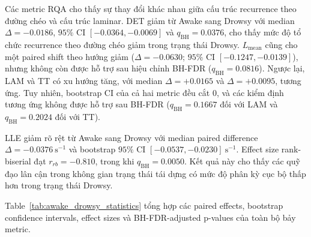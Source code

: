 Các metric RQA cho thấy sự thay đổi khác nhau giữa cấu trúc recurrence theo đường chéo và cấu trúc laminar. DET giảm từ Awake sang Drowsy với median $\Delta=-0.0186$, $95\%$ CI $[-0.0364,-0.0069]$ và $q_{\mathrm{BH}}=0.0376$, cho thấy mức độ tổ chức recurrence theo đường chéo giảm trong trạng thái Drowsy. $L_{\mathrm{mean}}$ cũng cho một paired shift theo hướng giảm ($\Delta=-0.0630$; $95\%$ CI $[-0.1247,-0.0139]$), nhưng không còn được hỗ trợ sau hiệu chỉnh BH-FDR ($q_{\mathrm{BH}}=0.0816$). Ngược lại, LAM và TT có xu hướng tăng, với median $\Delta=+0.0165$ và $\Delta=+0.0095$, tương ứng. Tuy nhiên, bootstrap CI của cả hai metric đều cắt $0$, và các kiểm định tương ứng không được hỗ trợ sau BH-FDR ($q_{\mathrm{BH}}=0.1667$ đối với LAM và $q_{\mathrm{BH}}=0.2024$ đối với TT).

LLE giảm rõ rệt từ Awake sang Drowsy với median paired difference $\Delta=-0.0376~\mathrm{s}^{-1}$ và bootstrap $95\%$ CI $[-0.0537,-0.0230]~\mathrm{s}^{-1}$. Effect size rank-biserial đạt $r_{rb}=-0.810$, trong khi $q_{\mathrm{BH}}=0.0050$. Kết quả này cho thấy các quỹ đạo lân cận trong không gian trạng thái tái dựng có mức độ phân kỳ cục bộ thấp hơn trong trạng thái Drowsy.

Table~\ref{tab:awake_drowsy_statistics} tổng hợp các paired effects, bootstrap confidence intervals, effect sizes và BH-FDR-adjusted p-values của toàn bộ bảy metric.

